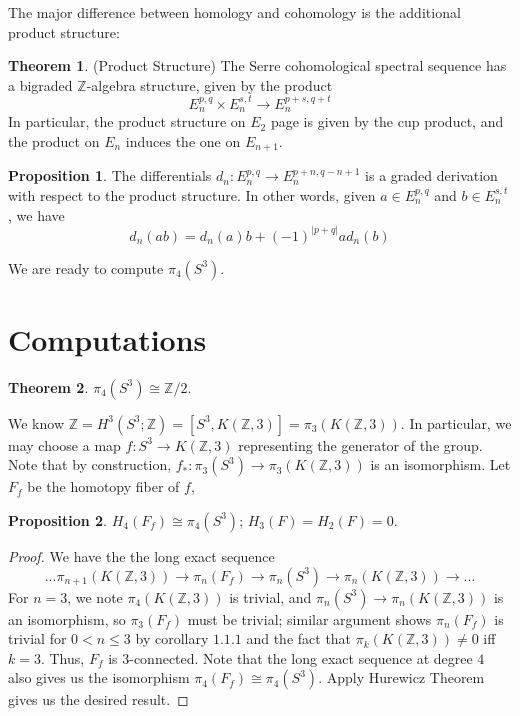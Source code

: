 \documentclass{article}
\theoremstyle{definition}
\newtheorem{theorem}{Theorem}[section]
\theoremstyle{definition}
\newtheorem{proposition}{Proposition}[theorem]
\theoremstyle{definition}
\theoremstyle{definition}
\theoremstyle{definition}
\theoremstyle{definition}
\begin{document}
The major difference between homology and cohomology is the additional product structure:
\begin{tcolorbox}[colback=red!5!white,colframe=red!30!white]
\begin{theorem}
(Product Structure) The Serre cohomological spectral sequence has a bigraded $\mathbb{Z}$-algebra structure, given by the product 
\[
E_n^{p,q}\times E_n^{s,t}\to E_n ^{p+s,q+t}
\]
In particular, the product structure on $E_2$ page is given by the cup product, and the product on $E_n$ induces the one on $E_{n+1}$.
\end{theorem}
\end{tcolorbox}


\begin{tcolorbox}[colback=blue!5!white,colframe=blue!30!white]
\begin{proposition}
    The differentials $d_n: E_n ^{p,q}\to E_n ^{p+n, q-n+1}$ is a graded derivation with respect to the product structure. In other words, given $a\in E_n ^{p,q}$ and $b\in E_n^{s,t}$, we have 
    \[
        d_n(ab)=d_n(a)b+(-1)^{|p+q|}ad_n(b) 
    \]
\end{proposition}
\end{tcolorbox}
We are ready to compute $\pi_4(S^3)$.

\section{Computations}

\begin{tcolorbox}[colback=red!5!white,colframe=red!30!white]
\begin{theorem}
    $\pi_4(S^3)\cong \mathbb{Z}/2$.
\end{theorem}
\end{tcolorbox}
We know $\mathbb{Z}=H^3(S^3;\mathbb{Z})=[S^3,K(\mathbb{Z},3)]=\pi_3(K(\mathbb{Z},3))$. In particular, we may choose a map $f: S^3\to K(\mathbb{Z},3)$ representing the generator of the group. Note that by construction, $f_*: \pi_3(S^3)\to \pi_3(K(\mathbb{Z},3))$ is an isomorphism. Let $F_f$ be the homotopy fiber of $f$,

\begin{tcolorbox}[colback=blue!5!white,colframe=blue!30!white]
\begin{proposition}
$H_4(F_f)\cong \pi_4(S^3)$; $H_3(F)=H_2(F)=0$.
\end{proposition}
\end{tcolorbox}

\begin{proof}
We have the the long exact sequence 
\[ ...\pi_{n+1}(K(\mathbb{Z},3))\to\pi_n(F_f)\to \pi_n(S^3)\to \pi_n(K(\mathbb{Z},3))\to...\]
For $n=3$, we note $\pi_{4}(K(\mathbb{Z},3))$ is trivial, and $\pi_n(S^3)\to \pi_n(K(\mathbb{Z},3))$ is an isomorphism, so $\pi_3(F_f)$ must be trivial; similar argument shows $\pi_n(F_f)$ is trivial for $0<n\leq 3$ by corollary $1.1.1$ and the fact that $\pi_k(K(\mathbb{Z},3))\neq 0$ iff $k=3$. Thus, $F_f$ is $3$-connected. Note that the long exact sequence at degree $4$ also gives us the isomorphism $\pi_4(F_f)\cong \pi_4(S^3)$. Apply Hurewicz Theorem gives us the desired result.
\end{proof}
\end{document}
